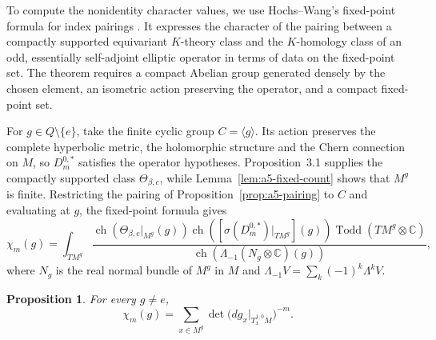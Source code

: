 \documentclass[11pt]{article}
\theoremstyle{definition}
\theoremstyle{plain}
\numberwithin{equation}{section}
\newtheorem{proposition}[theorem]{Proposition}
\begin{document}
To compute the nonidentity character values, we use
Hochs--Wang's fixed-point formula for index pairings
\cite[Theorem~2.18]{HochsWang}. It expresses the
character of the pairing between a compactly supported
equivariant $K$-theory class and the $K$-homology class
of an odd, essentially self-adjoint elliptic operator
in terms of data on the fixed-point set. The theorem
requires a compact Abelian group generated densely
by the chosen element, an isometric action preserving
the operator, and a compact fixed-point set.

For $g\in Q\setminus\{e\}$, take the finite cyclic group
$C=\langle g\rangle$. Its action preserves the complete
hyperbolic metric, the holomorphic structure and the
Chern connection on $M$, so $D_m^{0,*}$ satisfies the
operator hypotheses. Proposition~3.1 supplies the
compactly supported class $\Theta_{\beta,c}$, while
Lemma~\ref{lem:a5-fixed-count} shows that $M^g$ is finite. Restricting
the pairing of Proposition~\ref{prop:a5-pairing} to $C$ and evaluating
at $g$, the fixed-point formula gives
\begin{equation}\label{eq:fixed-point-pairing2}
\chi_m(g)=
\int_{TM^g}
\frac{
\operatorname{ch}(\Theta_{\beta,c}|_{M^g}(g))
\operatorname{ch}([\sigma(D_m^{0,*})|_{TM^g}](g))
\operatorname{Todd}(TM^g\otimes\mathbb C)
}{
\operatorname{ch}(\Lambda_{-1}(N_g\otimes\mathbb C)(g))
},
\end{equation}
where $N_g$ is the real normal bundle of $M^g$ in $M$
and $\Lambda_{-1}V=\sum_k(-1)^k\Lambda^kV$.


\begin{proposition}\label{prop:a5-local}
For every $g\ne e$,
\begin{equation}\label{eq:a5-local}
 \chi_m(g)=\sum_{x\in M^g}
    \det\bigl(dg_x|_{T_x^{1,0}M}\bigr)^{-m}.
\end{equation}
\end{proposition}
\end{document}
